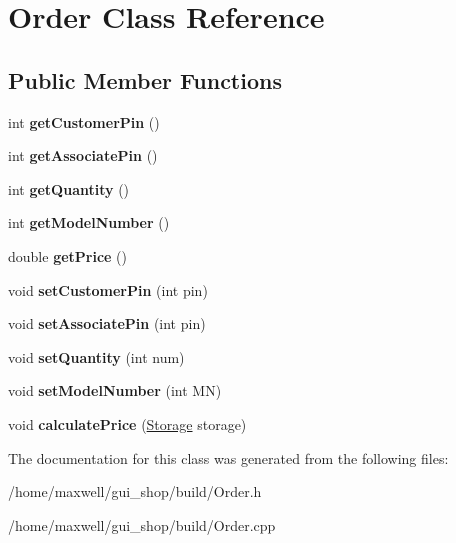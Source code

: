 \hypertarget{classOrder}{}\section{Order Class Reference}
\label{classOrder}
\subsection*{Public Member Functions}
\begin{DoxyCompactItemize}
\item 
int {\bfseries get\+Customer\+Pin} ()\hypertarget{classOrder_a580409072a98cb93cb79962d8b97ebdd}{}\label{classOrder_a580409072a98cb93cb79962d8b97ebdd}

\item 
int {\bfseries get\+Associate\+Pin} ()\hypertarget{classOrder_ab59d867a7364b9c282d8db09d2abe03e}{}\label{classOrder_ab59d867a7364b9c282d8db09d2abe03e}

\item 
int {\bfseries get\+Quantity} ()\hypertarget{classOrder_a458491516d3ef8338525f9be5f5f7dc8}{}\label{classOrder_a458491516d3ef8338525f9be5f5f7dc8}

\item 
int {\bfseries get\+Model\+Number} ()\hypertarget{classOrder_a8379026e646f8e9dc8efe19325bb3ee3}{}\label{classOrder_a8379026e646f8e9dc8efe19325bb3ee3}

\item 
double {\bfseries get\+Price} ()\hypertarget{classOrder_a587e5e46cc3dbe79cfc6c8a1634b845d}{}\label{classOrder_a587e5e46cc3dbe79cfc6c8a1634b845d}

\item 
void {\bfseries set\+Customer\+Pin} (int pin)\hypertarget{classOrder_ab5c20f421dc1f2a6e33093baaab606a1}{}\label{classOrder_ab5c20f421dc1f2a6e33093baaab606a1}

\item 
void {\bfseries set\+Associate\+Pin} (int pin)\hypertarget{classOrder_a3fe28671364733e57b3c409d7910909c}{}\label{classOrder_a3fe28671364733e57b3c409d7910909c}

\item 
void {\bfseries set\+Quantity} (int num)\hypertarget{classOrder_a45a25ede1d3cb3c47240cd87b77bfe5e}{}\label{classOrder_a45a25ede1d3cb3c47240cd87b77bfe5e}

\item 
void {\bfseries set\+Model\+Number} (int MN)\hypertarget{classOrder_a539c93f3494750c62eb287e25f2562fa}{}\label{classOrder_a539c93f3494750c62eb287e25f2562fa}

\item 
void {\bfseries calculate\+Price} (\hyperlink{classStorage}{Storage} storage)\hypertarget{classOrder_af8703a4de7d66900f44aa4d7aeed9073}{}\label{classOrder_af8703a4de7d66900f44aa4d7aeed9073}

\end{DoxyCompactItemize}


The documentation for this class was generated from the following files\+:\begin{DoxyCompactItemize}
\item 
/home/maxwell/gui\+\_\+shop/build/Order.\+h\item 
/home/maxwell/gui\+\_\+shop/build/Order.\+cpp\end{DoxyCompactItemize}
